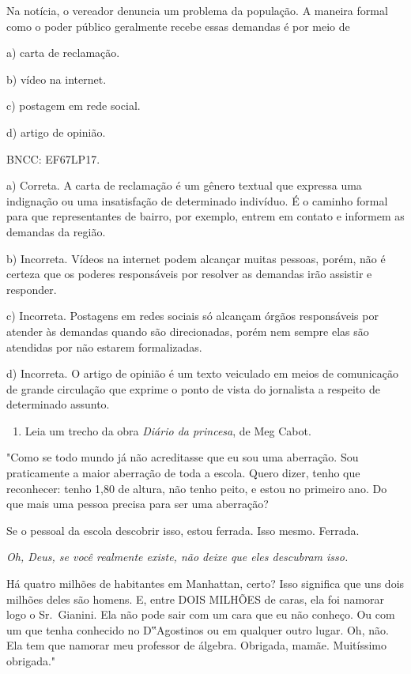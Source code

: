 Na notícia, o vereador denuncia um problema da população. A maneira
formal como o poder público geralmente recebe essas demandas é por meio
de

a) carta de reclamação.

b) vídeo na internet.

c) postagem em rede social.

d) artigo de opinião.

BNCC: EF67LP17.

a) Correta. A carta de reclamação é um gênero textual que expressa uma
indignação ou uma insatisfação de determinado indivíduo. É o caminho
formal para que representantes de bairro, por exemplo, entrem em contato
e informem as demandas da região.

b) Incorreta. Vídeos na internet podem alcançar muitas pessoas, porém,
não é certeza que os poderes responsáveis por resolver as demandas irão
assistir e responder.

c) Incorreta. Postagens em redes sociais só alcançam órgãos responsáveis
por atender às demandas quando são direcionadas, porém nem sempre elas
são atendidas por não estarem formalizadas.

d) Incorreta. O artigo de opinião é um texto veiculado em meios de
comunicação de grande circulação que exprime o ponto de vista do
jornalista a respeito de determinado assunto.

\begin{enumerate}
\def\labelenumi{\arabic{enumi}.}
\setcounter{enumi}{14}
\tightlist
\item
  Leia um trecho da obra \emph{Diário da princesa}, de Meg Cabot.
\end{enumerate}

"Como se todo mundo já não acreditasse que eu sou uma aberração. Sou
praticamente a maior aberração de toda a escola. Quero dizer, tenho que
reconhecer: tenho 1,80 de altura, não tenho peito, e estou no primeiro
ano. Do que mais uma pessoa precisa para ser uma aberração?

Se o pessoal da escola descobrir isso, estou ferrada. Isso mesmo.
Ferrada.

\emph{Oh, Deus, se você realmente existe, não deixe que eles descubram
isso.}

Há quatro milhões de habitantes em Manhattan, certo? Isso significa que
uns dois milhões deles são homens. E, entre DOIS MILHÕES de caras, ela
foi namorar logo o Sr.~Gianini. Ela não pode sair com um cara que eu não
conheço. Ou com um que tenha conhecido no D‟Agostinos ou em qualquer
outro lugar. Oh, não. Ela tem que namorar meu professor de álgebra.
Obrigada, mamãe. Muitíssimo obrigada."


